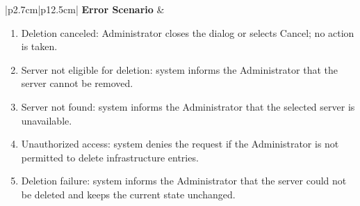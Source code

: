 \begin{table}[H]
\begin{tabular}{|p{2.7cm}|p{12.5cm}|}
        \textbf{Error Scenario} & \begin{minipage}[t]{\linewidth}
                                      \begin{enumerate}[topsep=0pt,itemsep=1pt,parsep=0pt,partopsep=0pt]
                                          \item Deletion canceled: Administrator closes the dialog or selects Cancel; no action is taken.
                                          \item Server not eligible for deletion: system informs the Administrator that the server cannot be removed.
                                          \item Server not found: system informs the Administrator that the selected server is unavailable.
                                          \item Unauthorized access: system denies the request if the Administrator is not permitted to delete infrastructure entries.
                                          \item Deletion failure: system informs the Administrator that the server could not be deleted and keeps the current state unchanged.
                                      \end{enumerate}
                                  \end{minipage} \\ \hline
    \end{tabular}
    \label{tab:admin-delete-proxmox}
\end{table}

